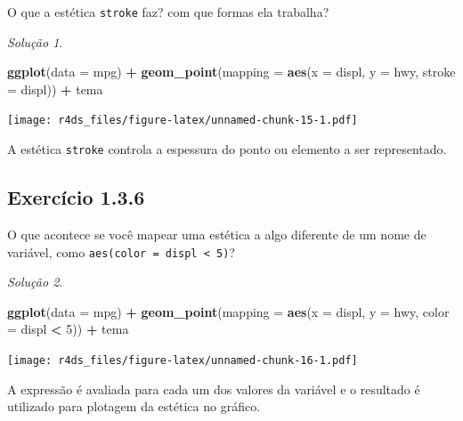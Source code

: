 \documentclass[
]{latex/krantz}
\newenvironment{Shaded}{\begin{snugshade}}{\end{snugshade}}
\newcommand{\AttributeTok}[1]{\textcolor[rgb]{0.13,0.29,0.53}{#1}}
\newcommand{\DecValTok}[1]{\textcolor[rgb]{0.00,0.00,0.81}{#1}}
\newcommand{\FunctionTok}[1]{\textcolor[rgb]{0.13,0.29,0.53}{\textbf{#1}}}
\newcommand{\NormalTok}[1]{#1}
\newcommand{\SpecialCharTok}[1]{\textcolor[rgb]{0.81,0.36,0.00}{\textbf{#1}}}
\theoremstyle{definition}
\theoremstyle{definition}
\theoremstyle{definition}
\theoremstyle{definition}
\theoremstyle{remark}
\newtheorem*{solution}{Solução}
\begin{document}
O que a estética \texttt{stroke} faz? com que formas ela trabalha?

\begin{solution}
\leavevmode

\begin{Shaded}
\begin{Highlighting}[]
\FunctionTok{ggplot}\NormalTok{(}\AttributeTok{data =}\NormalTok{ mpg) }\SpecialCharTok{+}
    \FunctionTok{geom\_point}\NormalTok{(}\AttributeTok{mapping =} \FunctionTok{aes}\NormalTok{(}\AttributeTok{x =}\NormalTok{ displ, }\AttributeTok{y =}\NormalTok{ hwy, }\AttributeTok{stroke =}\NormalTok{ displ)) }\SpecialCharTok{+}
\NormalTok{    tema}
\end{Highlighting}
\end{Shaded}

\texttt{[image: r4ds\_files/figure-latex/unnamed-chunk-15-1.pdf]}

A estética \texttt{stroke} controla a espessura do ponto ou elemento a ser representado.

\end{solution}

\hypertarget{exr1-3-6}{%
\subsection*{Exercício 1.3.6}\label{exr1-3-6}}

O que acontece se você mapear uma estética a algo diferente de um nome de variável, como \texttt{aes(color\ =\ displ\ \textless{}\ 5)}?

\begin{solution}
\leavevmode

\begin{Shaded}
\begin{Highlighting}[]
\FunctionTok{ggplot}\NormalTok{(}\AttributeTok{data =}\NormalTok{ mpg) }\SpecialCharTok{+}
    \FunctionTok{geom\_point}\NormalTok{(}\AttributeTok{mapping =} \FunctionTok{aes}\NormalTok{(}\AttributeTok{x =}\NormalTok{ displ, }\AttributeTok{y =}\NormalTok{ hwy, }\AttributeTok{color =}\NormalTok{ displ }\SpecialCharTok{\textless{}} \DecValTok{5}\NormalTok{)) }\SpecialCharTok{+}
\NormalTok{    tema}
\end{Highlighting}
\end{Shaded}

\texttt{[image: r4ds\_files/figure-latex/unnamed-chunk-16-1.pdf]}

A expressão é avaliada para cada um dos valores da variável e o resultado é utilizado para plotagem da estética no gráfico.

\end{solution}
\end{document}
